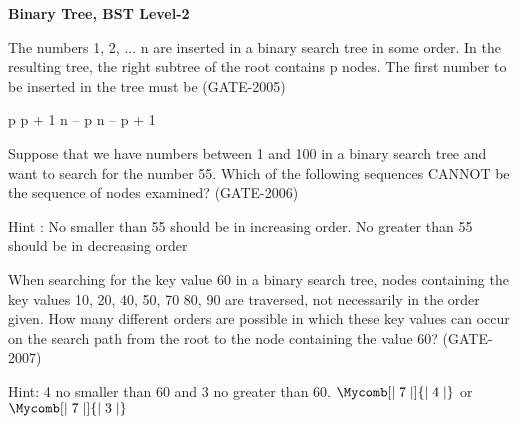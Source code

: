 
\centerline{\textbf{ \LARGE Binary Tree, BST Level-2}}

\begin{questyle}
  \question  The numbers 1, 2, ... n are inserted in a binary search tree in some order. In the resulting
             tree, the right subtree of the root contains p nodes. The first number to be inserted in
             the tree must be  (GATE-2005)

  \begin{oneparchoices}
    \choice         p
    \choice         p + 1
    \CorrectChoice  n – p
    \choice         n – p + 1
  \end{oneparchoices}
\end{questyle}


\begin{questyle}
  \question  Suppose that we have numbers between 1 and 100 in a binary search tree and want to
            search for the number 55. Which of the following sequences CANNOT be the sequence
            of nodes examined?  (GATE-2006)

  \begin{choices}
  \end{choices}
  Hint : No smaller than 55 should be in increasing order. No greater than 55 should be in decreasing order
\end{questyle}

\begin{questyle}
  \question  When searching for the key value 60 in a binary search tree, nodes containing
            the key values 10, 20, 40, 50, 70 80, 90 are traversed, not necessarily in the order given.
            How many different orders are possible in which these key values can occur on the
            search path from the root to the node containing the value 60?  (GATE-2007)

  \begin{oneparchoices}
  \end{oneparchoices}

  Hint: 4 no smaller than 60 and 3 no greater than 60. \( \Mycomb[\mid 7 \mid]{\mid 4 \mid} \) or \( \Mycomb[\mid 7 \mid]{\mid 3 \mid} \)
\end{questyle}

